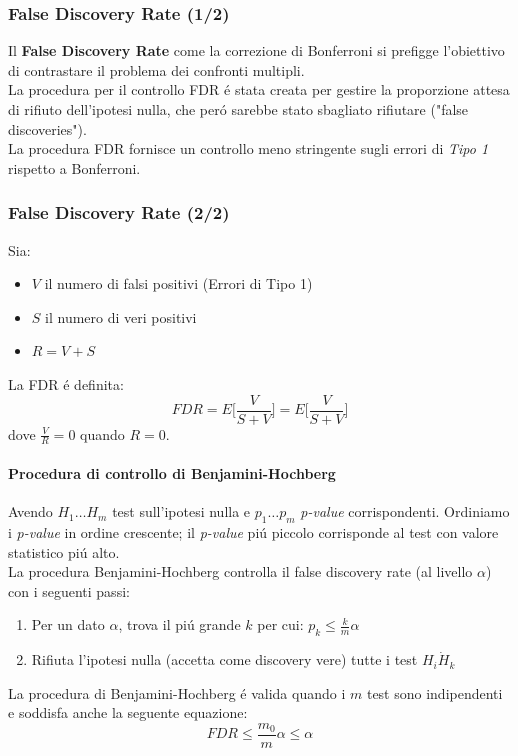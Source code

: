 \documentclass{beamer}
\begin{document}
\begin{frame}
\frametitle{False Discovery Rate (1/2)}
Il \textbf{False Discovery Rate} come la correzione di Bonferroni si prefigge l'obiettivo di contrastare il problema dei confronti multipli.\\
\smallskip
La procedura per il controllo FDR \'e stata creata per gestire la proporzione attesa di rifiuto dell'ipotesi nulla,  che per\'o sarebbe stato sbagliato rifiutare ("false discoveries").\\
\smallskip
La procedura FDR fornisce un controllo meno stringente sugli errori di \textit{Tipo 1} rispetto a Bonferroni.
\end{frame}

\begin{frame}
\frametitle{False Discovery Rate (2/2)}
Sia:
\begin{itemize}
\item $V$ il numero di falsi positivi (Errori di Tipo 1)
\item $S$ il numero di veri positivi 
\item $R =  V+S$ 
\end{itemize}
La FDR \'e definita:
\begin{equation*}
FDR = E\Big[\frac{V}{S+V}\Big] = E\Big[\frac{V}{S+V}\Big]
\end{equation*}
dove $\frac{V}{R} = 0$ quando $R = 0$.
\end{frame}

\begin{frame}
\framesubtitle{Procedura di controllo di Benjamini-Hochberg}
Avendo $H_1 \dots H_m$ test sull'ipotesi nulla e $p_1 \dots p_m$ \textit{p-value} corrispondenti. Ordiniamo i \textit{p-value} in ordine crescente; il \textit{p-value} pi\'u piccolo corrisponde al test con valore statistico pi\'u alto.\\
\smallskip
La procedura Benjamini-Hochberg controlla il false discovery rate (al livello $\alpha$) con i seguenti passi:\\
\medskip
\begin{enumerate}
\item Per un dato $\alpha$, trova il pi\'u grande $k$ per cui: $p_k \leq \frac{k}{m}\alpha$
\item Rifiuta l'ipotesi nulla (accetta come discovery vere) tutte i test $H_i \dot H_k$
\end{enumerate}
La procedura di Benjamini-Hochberg \'e valida quando i $m$ test sono indipendenti e soddisfa anche la seguente equazione:
\begin{equation*}
FDR \leq \frac{m_0}{m}\alpha \leq \alpha
\end{equation*}
\end{frame}
\end{document}
